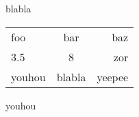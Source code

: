 blabla
\begin{tabular}{|l|c|r|}
    foo & bar & baz \\
    3.5 & 8 & zor \\
    youhou & blabla & yeepee
\end{tabular}
youhou
